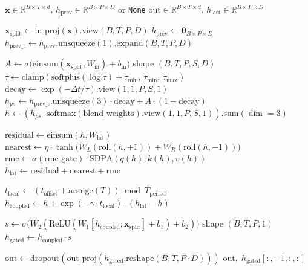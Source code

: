 \documentclass[11pt]{article}
\theoremstyle{definition}
\newcommand{\RR}{\mathbb{R}}
\newcommand{\vx}{\mathbf{x}}
\newcommand{\sigmoid}{\sigma}
\begin{document}
\begin{algorithm}[h]
\caption{MTLNNLayer.forward — vectorised over P protofilaments}
\label{alg:mt_dl}
\begin{algorithmic}[1]
\Require $\vx\in\RR^{B\times T\times d}$,\; $h_\text{prev}\in\RR^{B\times P\times D}$ or \texttt{None}
\Ensure $\text{out}\in\RR^{B\times T\times d}$,\; $h_\text{last}\in\RR^{B\times P\times D}$

\State $\vx_\text{split} \leftarrow \text{in\_proj}(\vx).\text{view}(B,T,P,D)$ 
 $h_\text{prev}\leftarrow\mathbf{0}_{B\times P\times D}$ \EndIf
\State $h_\text{prev\_t}\leftarrow h_\text{prev}.\text{unsqueeze}(1).\text{expand}(B,T,P,D)$

\State {}
\State $A \leftarrow \sigmoid\!\bigl(\text{einsum}(\vx_\text{split}, W_\text{in}) + b_\text{in}\bigr)$ \quad shape $(B,T,P,S,D)$
\State $\tau \leftarrow \text{clamp}(\text{softplus}(\log\tau)+\tau_\text{min},\,\tau_\text{min},\,\tau_\text{max})$
\State $\text{decay} \leftarrow \exp(-\Delta t/\tau).\text{view}(1,1,P,S,1)$
\State $h_{ps} \leftarrow h_\text{prev\_t}.\text{unsqueeze}(3)\cdot\text{decay} + A\cdot(1-\text{decay})$
\State $h \leftarrow (h_{ps}\cdot\text{softmax}(\text{blend\_weights}).\text{view}(1,1,P,S,1)).\text{sum}(\dim=3)$ 

\State {}
\State $\text{residual} \leftarrow \text{einsum}(h, W_\text{lat})$
\State $\text{nearest} \leftarrow \eta\cdot\tanh\!\bigl(W_L(\text{roll}(h,+1))+W_R(\text{roll}(h,-1))\bigr)$
\State $\text{rmc} \leftarrow \sigmoid(\text{rmc\_gate})\cdot\text{SDPA}(q(h),k(h),v(h))$
\State $h_\text{lat} \leftarrow \text{residual}+\text{nearest}+\text{rmc}$

\State {}
\State $t_\text{local} \leftarrow (t_\text{offset}+\text{arange}(T))\bmod T_\text{period}$
\State $h_\text{coupled} \leftarrow h + \exp(-\gamma\cdot t_\text{local})\cdot(h_\text{lat}-h)$

\State {}
\State $s \leftarrow \sigmoid\!\bigl(W_2(\mathrm{ReLU}(W_1[h_\text{coupled};\vx_\text{split}]+b_1)+b_2)\bigr)$ \quad shape $(B,T,P,1)$
\State $h_\text{gated} \leftarrow h_\text{coupled}\cdot s$

\State $\text{out} \leftarrow \text{dropout}(\text{out\_proj}(h_\text{gated}.\text{reshape}(B,T,P\cdot D)))$
\State \Return $\text{out},\; h_\text{gated}[:,{-1},:,:]$
\end{algorithmic}
\end{algorithm}
\end{document}
